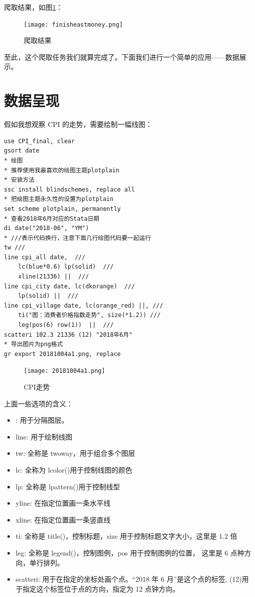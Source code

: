 \documentclass[cn,fancy,blue,11pt]{elegantbook}
\begin{document}
爬取结果，如图\ref{fig:finisheastmoney}：

\begin{figure}
  \centering
  \texttt{[image: finisheastmoney.png]}
  \caption{爬取结果}
  \label{fig:finisheastmoney}
\end{figure}

至此，这个爬取任务我们就算完成了。下面我们进行一个简单的应用------数据展示。

\hypertarget{section-39}{%
\section{数据呈现}\label{section-39}}

假如我想观察 CPI 的走势，需要绘制一幅线图：

\begin{lstlisting}
use CPI_final, clear
gsort date
* 绘图
* 推荐使用我最喜欢的绘图主题plotplain
* 安装方法
ssc install blindschemes, replace all
* 把绘图主题永久性的设置为plotplain
set scheme plotplain, permanently
* 查看2018年6月对应的Stata日期
di date("2018-06", "YM")
* ///表示代码换行，注意下面几行绘图代码要一起运行
tw ///
line cpi_all date,  ///
    lc(blue*0.6) lp(solid)  ///
    xline(21336) ||  ///
line cpi_city date, lc(dkorange)  ///
    lp(solid) ||  ///
line cpi_village date, lc(orange_red) ||, ///
    ti("图：消费者价格指数走势", size(*1.2)) ///
    leg(pos(6) row(1))  ||  ///
scatteri 102.3 21336 (12) "2018年6月"
* 导出图片为png格式
gr export 20181004a1.png, replace
\end{lstlisting}

\begin{figure}
  \centering
  \texttt{[image: 20181004a1.png]}
  \caption{CPI走势}
  \label{fig:20181004a1}
\end{figure}

上面一些选项的含义：

\begin{itemize}
\item
  \textbar{}\textbar{}: 用于分隔图层。
\item
  line: 用于绘制线图
\item
  tw: 全称是 twoway，用于组合多个图层
\item
  lc: 全称为 lcolor()用于控制线图的颜色
\item
  lp: 全称是 lpattern()用于控制线型
\item
  yline: 在指定位置画一条水平线
\item
  xline: 在指定位置画一条竖直线
\item
  ti: 全称是 title()，控制标题，size 用于控制标题文字大小，这里是 1.2 倍
\item
  leg: 全称是 legend()，控制图例，pos 用于控制图例的位置，
  这里是 6 点种方向，单行排列。
\item
  scatteri: 用于在指定的坐标处画个点。``2018 年 6 月''是这个点的标签, (12)用于指定这个标签位于点的方向，指定为 12 点钟方向。
\end{itemize}
\end{document}
